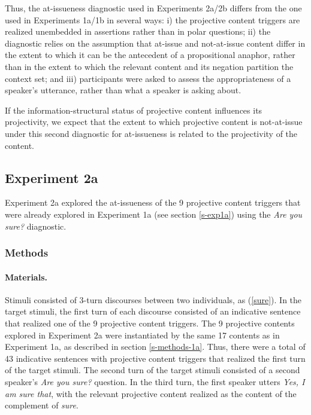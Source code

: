 \documentclass[11pt,fleqn]{article}
\newcommand{\6}{\mbox{$[\hspace*{-.6mm}[$}}
\newcommand{\9}{\mbox{$]\hspace*{-.6mm}]$}}
\begin{document}
Thus, the at-issueness diagnostic used in Experiments 2a/2b differs from the one used in Experiments 1a/1b in several ways: i) the projective content triggers are realized unembedded in assertions rather than in polar questions; ii) the diagnostic relies on the assumption that at-issue and not-at-issue content differ in the extent to which it can be the antecedent of a propositional anaphor, rather than in the extent to which the relevant content and its negation partition the context set; and iii) participants were asked to assess the appropriateness of a speaker's utterance, rather than what a speaker is asking about.

If the information-structural status of projective content influences its projectivity, we expect that the extent to which projective content is not-at-issue under this second diagnostic for at-issueness is related to the projectivity of the content.

\subsection{Experiment 2a}

Experiment 2a explored the at-issueness of the 9 projective content triggers that were already explored in Experiment 1a (see section \ref{s-exp1a}) using the {\em Are you sure?} diagnostic.

\subsubsection{Methods}\label{s-methods-2a}

\paragraph{Materials.} Stimuli consisted of 3-turn discourses between two individuals, as (\ref{sure}). In the target stimuli, the first turn of each discourse consisted of an indicative sentence that realized one of the 9 projective content triggers. The 9 projective contents explored in Experiment 2a were instantiated by the same 17 contents as in Experiment 1a, as described in section \ref{s-methods-1a}. Thus, there were a total of 43 indicative sentences with projective content triggers that realized the first turn of the target stimuli. The second turn of the target stimuli consisted of a second speaker's {\em Are you sure?} question. In the third turn, the first speaker utters {\em Yes, I am sure that}, with the relevant projective content realized as the content of the complement of {\em sure}. 
\end{document}
